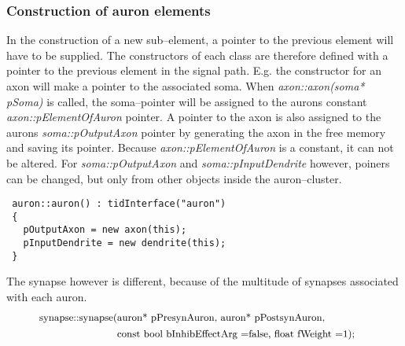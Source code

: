 
	


	\subsubsection{Construction of auron elements} %
	In the construction of a new sub--element, a pointer to the previous element will have to be supplied. 
	The constructors of each class are therefore defined with a pointer to the previous element in the signal path. E.g. the constructor for an axon will make a pointer to the associated soma. 
	When \emph{axon::axon(soma* pSoma)} is called, the soma--pointer will be assigned to the aurons constant \emph{axon::pElementOfAuron} pointer.
	A pointer to the axon is also assigned to the aurons \emph{soma::pOutputAxon} pointer by generating the axon in the free memory and saving its pointer.
	Because \emph{axon::pElementOfAuron} is a constant, it can not be altered. For \emph{soma::pOutputAxon} and \emph{soma::pInputDendrite} however, poiners can be changed, but only from other objects inside the auron--cluster.


\begin{lstlisting}
 auron::auron() : tidInterface("auron")
 {
   pOutputAxon = new axon(this);         
   pInputDendrite = new dendrite(this);
 }
\end{lstlisting}

	The synapse however is different, because of the multitude of synapses associated with each auron. 
	\begin{equation} \nonumber
		\begin{split}
			\text{\small{synapse::synapse(}} &\text{\small{auron* pPresynAuron, auron* pPostsynAuron,}} \qquad \qquad\\
													&\text{\small{const bool bInhibEffectArg =false, float fWeight =1);}}
		\end{split} %
	\end{equation} %
			

